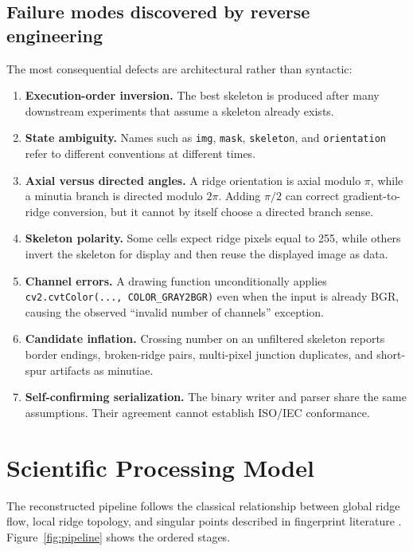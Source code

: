 \documentclass[11pt]{article}
\begin{document}
\subsection{Failure modes discovered by reverse engineering}

The most consequential defects are architectural rather than syntactic:

\begin{enumerate}
  \item \textbf{Execution-order inversion.} The best skeleton is produced after many downstream experiments that assume a skeleton already exists.
  \item \textbf{State ambiguity.} Names such as \texttt{img}, \texttt{mask}, \texttt{skeleton}, and \texttt{orientation} refer to different conventions at different times.
  \item \textbf{Axial versus directed angles.} A ridge orientation is axial modulo $\pi$, while a minutia branch is directed modulo $2\pi$. Adding $\pi/2$ can correct gradient-to-ridge conversion, but it cannot by itself choose a directed branch sense.
  \item \textbf{Skeleton polarity.} Some cells expect ridge pixels equal to 255, while others invert the skeleton for display and then reuse the displayed image as data.
  \item \textbf{Channel errors.} A drawing function unconditionally applies \texttt{cv2.cvtColor(..., COLOR\_GRAY2BGR)} even when the input is already BGR, causing the observed ``invalid number of channels'' exception.
  \item \textbf{Candidate inflation.} Crossing number on an unfiltered skeleton reports border endings, broken-ridge pairs, multi-pixel junction duplicates, and short-spur artifacts as minutiae.
  \item \textbf{Self-confirming serialization.} The binary writer and parser share the same assumptions. Their agreement cannot establish ISO/IEC conformance.
\end{enumerate}

\section{Scientific Processing Model}

The reconstructed pipeline follows the classical relationship between global ridge flow, local ridge topology, and singular points described in fingerprint literature \cite{hong1998enhancement,bazen2002directional,maltoni2009handbook}. Figure~\ref{fig:pipeline} shows the ordered stages.
\end{document}
